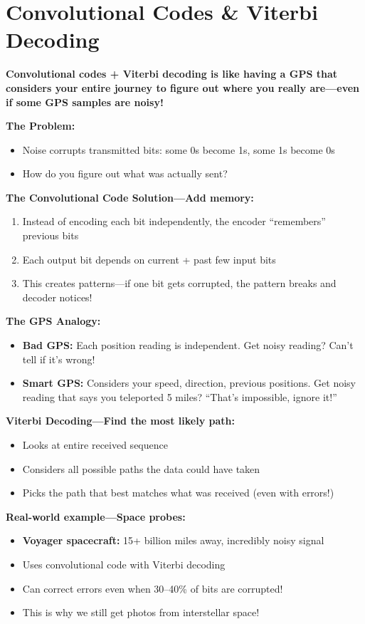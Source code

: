 \chapter{Convolutional Codes \& Viterbi Decoding}
\label{ch:convolutional-codes}

\begin{nontechnical}
\textbf{Convolutional codes + Viterbi decoding is like having a GPS that considers your entire journey to figure out where you really are---even if some GPS samples are noisy!}


\textbf{The Problem:} 
\begin{itemize}
\item Noise corrupts transmitted bits: some 0s become 1s, some 1s become 0s
\item How do you figure out what was actually sent?
\end{itemize}

\textbf{The Convolutional Code Solution---Add memory:}
\begin{enumerate}
\item Instead of encoding each bit independently, the encoder ``remembers'' previous bits
\item Each output bit depends on current + past few input bits
\item This creates patterns---if one bit gets corrupted, the pattern breaks and decoder notices!
\end{enumerate}

\textbf{The GPS Analogy:}
\begin{itemize}
\item \textbf{Bad GPS:} Each position reading is independent. Get noisy reading? Can't tell if it's wrong!
\item \textbf{Smart GPS:} Considers your speed, direction, previous positions. Get noisy reading that says you teleported 5 miles? ``That's impossible, ignore it!''
\end{itemize}

\textbf{Viterbi Decoding---Find the most likely path:}
\begin{itemize}
\item Looks at entire received sequence
\item Considers all possible paths the data could have taken
\item Picks the path that best matches what was received (even with errors!)
\end{itemize}

\textbf{Real-world example---Space probes:}
\begin{itemize}
\item \textbf{Voyager spacecraft:} 15+ billion miles away, incredibly noisy signal
\item Uses convolutional code with Viterbi decoding
\item Can correct errors even when 30--40\% of bits are corrupted!
\item This is why we still get photos from interstellar space!
\end{itemize}


\end{nontechnical}
